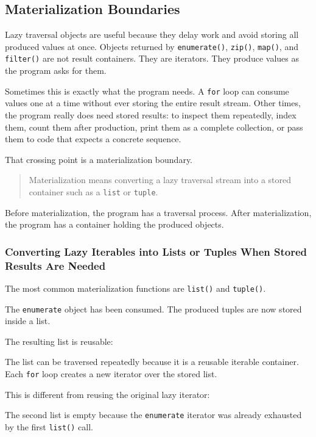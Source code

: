 \subsection{Materialization Boundaries}

Lazy traversal objects are useful because they delay work and avoid storing all produced values at once. Objects returned by \texttt{enumerate()}, \texttt{zip()}, \texttt{map()}, and \texttt{filter()} are not result containers. They are iterators. They produce values as the program asks for them.

Sometimes this is exactly what the program needs. A \texttt{for} loop can consume values one at a time without ever storing the entire result stream. Other times, the program really does need stored results: to inspect them repeatedly, index them, count them after production, print them as a complete collection, or pass them to code that expects a concrete sequence.

That crossing point is a materialization boundary.

\begin{quote}
Materialization means converting a lazy traversal stream into a stored container such as a \texttt{list} or \texttt{tuple}.
\end{quote}

Before materialization, the program has a traversal process. After materialization, the program has a container holding the produced objects.

\subsubsection{Converting Lazy Iterables into Lists or Tuples When Stored Results Are Needed}

The most common materialization functions are \texttt{list()} and \texttt{tuple()}.

The \texttt{enumerate} object has been consumed. The produced tuples are now stored inside a list.

The resulting list is reusable:

The list can be traversed repeatedly because it is a reusable iterable container. Each \texttt{for} loop creates a new iterator over the stored list.

This is different from reusing the original lazy iterator:

The second list is empty because the \texttt{enumerate} iterator was already exhausted by the first \texttt{list()} call.

